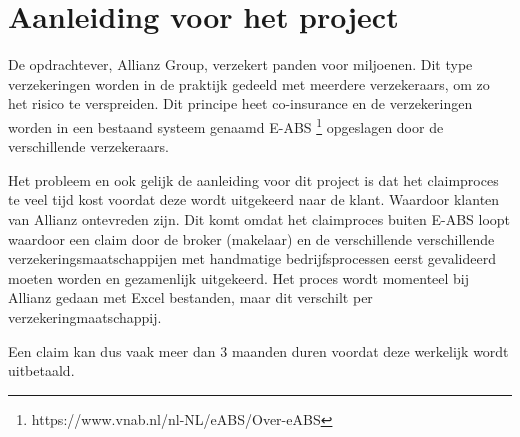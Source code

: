 \chapter{Aanleiding voor het project}
De opdrachtever, Allianz Group, verzekert panden voor miljoenen. Dit type verzekeringen worden in de praktijk gedeeld met meerdere verzekeraars, om zo het risico te verspreiden. Dit principe heet co-insurance en de verzekeringen worden in een bestaand systeem genaamd E-ABS \footnote{https://www.vnab.nl/nl-NL/eABS/Over-eABS} opgeslagen door de verschillende verzekeraars.\par

Het probleem en ook gelijk de aanleiding voor dit project is dat het claimproces te veel tijd kost voordat deze wordt uitgekeerd naar de klant. Waardoor klanten van Allianz ontevreden zijn. Dit komt omdat het claimproces buiten E-ABS loopt waardoor een claim door de broker (makelaar) en de verschillende verschillende verzekeringsmaatschappijen met handmatige bedrijfsprocessen eerst gevalideerd moeten worden en gezamenlijk uitgekeerd. Het proces wordt momenteel bij Allianz gedaan met Excel bestanden, maar dit verschilt per verzekeringmaatschappij.\par

 Een claim kan dus vaak meer dan 3 maanden duren voordat deze werkelijk wordt uitbetaald.
